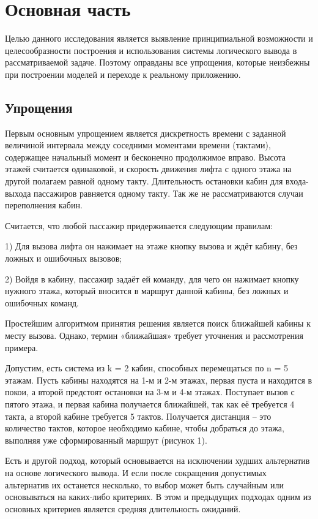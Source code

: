 \section{ Основная часть}

	Целью данного исследования является выявление принципиальной возможности и целесообразности построения
		и использования системы логического вывода в рассматриваемой задаче.
		Поэтому оправданы все упрощения, которые неизбежны при построении моделей и переходе к реальному приложению.

\subsection{Упрощения}
	Первым основным упрощением является дискретность времени с заданной величиной интервала между
		соседними моментами времени (тактами), содержащее начальный момент и бесконечно продолжимое вправо.
		Высота этажей считается одинаковой, и скорость движения лифта с одного этажа на другой полагаем
		равной одному такту. Длительность остановки кабин для входа-выхода пассажиров равняется одному такту.
		Так же не рассматриваются случаи переполнения кабин.

	Считается, что любой пассажир придерживается следующим правилам:

	1) Для вызова лифта он нажимает на этаже кнопку вызова и ждёт кабину, без ложных и ошибочных вызовов;

	2) Войдя в кабину, пассажир задаёт ей команду, для чего он нажимает кнопку нужного этажа,
		который вносится в маршрут данной кабины, без ложных и ошибочных команд.

	Простейшим алгоритмом принятия решения является поиск ближайшей кабины к месту вызова.
		Однако, термин «ближайшая» требует уточнения и рассмотрения примера. 

	Допустим, есть система из k = 2 кабин, способных перемещаться по n = 5 этажам.
		Пусть кабины находятся на 1-м и 2-м этажах, первая пуста и находится в покои,
		а второй предстоят остановки на 3-м и 4-м этажах. Поступает вызов с пятого этажа,
		и первая кабина получается ближайшей, так как её требуется 4 такта,
		а второй кабине требуется 5 тактов. Получается дистанция – это количество тактов,
		которое необходимо кабине, чтобы добраться до этажа, выполняя уже сформированный маршрут (рисунок 1).

	Есть и другой подход, который основывается на исключении худших альтернатив на основе логического вывода.
		И если после сокращения допустимых альтернатив их останется несколько,
		то выбор может быть случайным или основываться на каких-либо критериях.
		В этом и предыдущих подходах одним из основных критериев является средняя длительность ожиданий.

